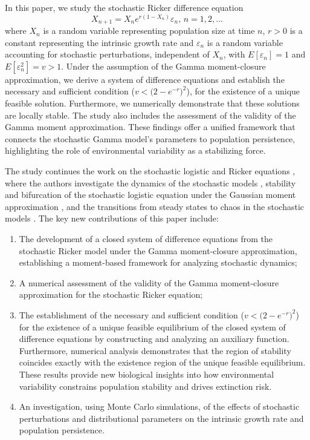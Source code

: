 \documentclass[12pt]{article}
\theoremstyle{definition}
\begin{document}
In this paper, we study the stochastic Ricker difference equation
\begin{equation}
  X_{n+1} = X_n e^{r(1 - X_n)} \varepsilon_n,\, n=1,2,... \label{eq:model}
\end{equation}
where \( X_n \) is a random variable representing population size at time \( n \), $r > 0$ is a constant representing the intrinsic growth rate and $\varepsilon_n$ 
is a random variable accounting for stochastic perturbations, independent of $X_n$, 
with $E[\varepsilon_n] = 1$ and $E[\varepsilon_n^2] = v > 1$.  Under the assumption of the Gamma moment-closure approximation, we derive a system of difference equations and establish the necessary and sufficient condition ($v< \big(2-e^{-r}\big)^2$), for the existence of a unique feasible solution.  Furthermore, we numerically demonstrate that these solutions are locally stable. The study also includes the assessment of the validity of the Gamma moment approximation. These findings offer a unified framework that connects the stochastic Gamma model's parameters to population persistence, highlighting the role of environmental variability as a stabilizing force.

The study continues the work on the stochastic logistic and Ricker equations \cite{wang2025,Wang2026,wang2025chaos}, where the authors investigate the dynamics of the stochastic models \cite{wang2025}, stability and bifurcation of the stochastic logistic equation under the Gaussian moment approximation \cite{Wang2026}, and the transitions from steady states to chaos in the stochastic models \cite{wang2025chaos}. The key new contributions of this paper include:
\begin{enumerate}
    \item The development of a closed system of difference equations from the stochastic Ricker model under the Gamma moment-closure approximation, establishing a moment-based framework for analyzing stochastic dynamics;
    \item A numerical assessment of the validity of the Gamma moment-closure approximation for the stochastic Ricker equation;
    \item The establishment of the necessary and sufficient condition ($v< \big(2-e^{-r}\big)^2$) for the existence of a unique feasible equilibrium of the closed system of difference equations by constructing and analyzing an auxiliary function. Furthermore, numerical analysis demonstrates that the region of stability coincides exactly with the existence region of the unique feasible equilibrium. These results provide new biological insights into how environmental variability constrains population stability and drives extinction risk.
    \item An investigation, using Monte Carlo simulations, of the effects of stochastic perturbations and distributional parameters on the intrinsic growth rate and population persistence.  
\end{enumerate}
\end{document}
